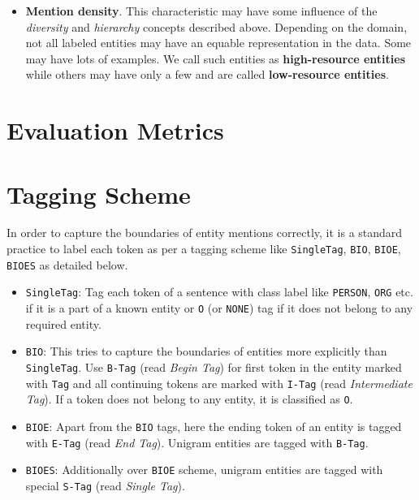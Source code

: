 \begin{itemize}
    \item \textbf{Mention density}. This characteristic may have some influence of the \textit{diversity} and \textit{hierarchy} concepts described above. Depending on the domain, not all labeled entities may have an equable representation in the data. Some may have lots of examples. We call such entities as \textbf{high-resource entities} while others may have only a few and are called \textbf{low-resource entities}.
    
\end{itemize}

\section{Evaluation Metrics}

\section{Tagging Scheme}
\label{sec:tagging_scheme}
In order to capture the boundaries of entity mentions correctly, it is a standard practice to label each token as per a tagging scheme like \texttt{SingleTag}, \texttt{BIO}, \texttt{BIOE}, \texttt{BIOES} as detailed below.

\begin{itemize}
    \item \texttt{SingleTag}: Tag each token of a sentence with class label like \texttt{PERSON}, \texttt{ORG} etc. if it is a part of a known entity or \texttt{O} (or \texttt{NONE}) tag if it does not belong to any required entity.
    
    \item \texttt{BIO}: This tries to capture the boundaries of entities more explicitly than \texttt{SingleTag}. Use \texttt{B-Tag} (read \textit{Begin Tag}) for first token in the entity marked with \texttt{Tag} and all continuing tokens are marked with \texttt{I-Tag} (read \textit{Intermediate Tag}). If a token does not belong to any entity, it is classified as \texttt{O}.
    
    \item \texttt{BIOE}: Apart from the \texttt{BIO} tags, here the ending token of an entity is tagged with \texttt{E-Tag} (read \textit{End Tag}). Unigram entities are tagged with \texttt{B-Tag}.
    
    \item \texttt{BIOES}: Additionally over \texttt{BIOE} scheme, unigram entities are tagged with special \texttt{S-Tag} (read \textit{Single Tag}).
\end{itemize}

